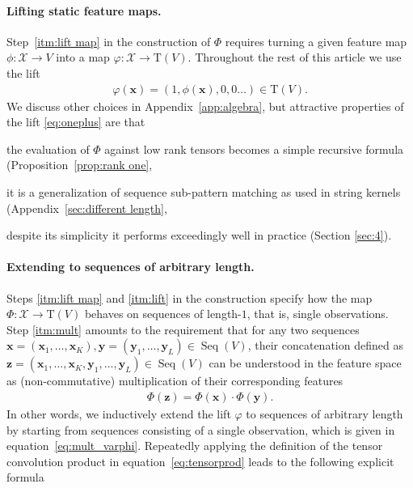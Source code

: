 \documentclass{article} \usepackage{iclr2021_conference,times}
\def\eqref#1{equation~\ref{#1}}
\newcommand{\bx}{\mathbf{x}}
\newcommand{\bz}{\mathbf{z}}
\newcommand{\by}{\mathbf{y}}
\newcommand{\cX}{\mathcal{X}}
\newcommand{\T}[1]{\mathrm{T}({#1})}
\newcommand{\Seq}[1]{\operatorname{Seq}(#1)}
\theoremstyle{plain}
\theoremstyle{definition}
\begin{document}
\paragraph{Lifting static feature maps.}
Step~\ref{itm:lift map} in the construction of $\Phi$ requires turning a given feature map $\phi:\cX \to V$ into a map $\varphi: \cX \to \T{V}$.
Throughout the rest of this article we use the lift  
\begin{align} \label{eq:oneplus}
  \varphi(\bx) = (1, \phi(\bx), 0, 0 \ldots ) \in \T{V}.
\end{align}
We discuss other choices in Appendix~\ref{app:algebra}, but attractive properties of the lift \ref{eq:oneplus} are that
\begin{enumerate*}[label=(\alph*)]
\item
  the evaluation of $\Phi$ against low rank tensors becomes a simple recursive formula (Proposition~\ref{prop:rank one}, 
\item 
  it is a generalization of sequence sub-pattern matching as used in string kernels (Appendix~\ref{sec:different length},  
\item 
  despite its simplicity it performs exceedingly well in practice (Section \ref{sec:4}).
\end{enumerate*}

\paragraph{Extending to sequences of arbitrary length.} Steps \ref{itm:lift map} and \ref{itm:lift} in the construction specify how the map $\Phi: \cX \rightarrow \T{V}$ behaves on sequences of length-$1$, that is, single observations. Step \ref{itm:mult} amounts to the requirement that for any two sequences $\bx = (\bx_1, \dots, \bx_K), \by=(\by_1, \dots, \by_L) \in \Seq{V}$, their concatenation defined as $\bz = (\bx_1, \dots, \bx_K, \by_1, \dots, \by_L) \in \Seq{V}$ can be understood in the feature space as (non-commutative) multiplication of their corresponding features
\begin{align}
	\Phi(\bz) = \Phi(\bx) \cdot \Phi(\by). \label{eq:conc_product}
\end{align}
In other words, we inductively extend the lift $\varphi$ to sequences of arbitrary length by starting from sequences consisting of a single observation, which is given in \eqref{eq:mult_varphi}.
Repeatedly applying the definition of the tensor convolution product in \eqref{eq:tensorprod} leads to the following explicit formula
\end{document}
